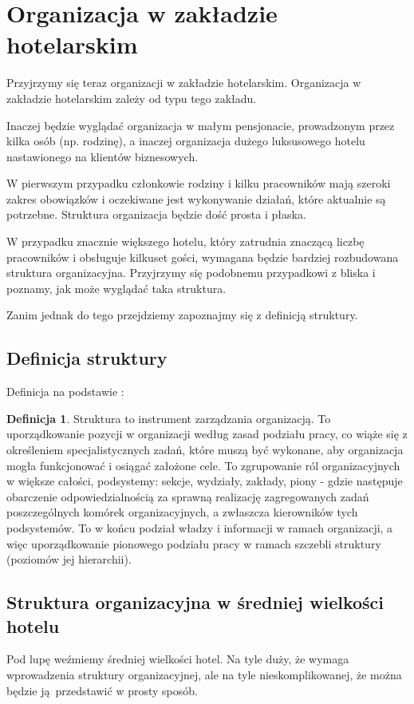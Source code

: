 \documentclass[a4paper,onecolumn,oneside,11pt,wide,floatssmall]{mwrep}
\theoremstyle{definition}
\newtheorem{defn}{Definicja}[section]
\theoremstyle{plain}%
\theoremstyle{remark}
\begin{document}
\section{Organizacja w zakładzie hotelarskim}
Przyjrzymy się teraz organizacji w zakładzie hotelarskim. Organizacja w 
zakładzie hotelarskim zależy od typu tego zakładu.

Inaczej będzie wyglądać organizacja w małym pensjonacie, prowadzonym przez 
kilka osób (np. rodzinę), a inaczej organizacja dużego 
luksusowego hotelu nastawionego na klientów biznesowych. 

W pierwszym przypadku członkowie rodziny i kilku pracowników mają szeroki 
zakres obowiązków i oczekiwane jest wykonywanie działań, które aktualnie są 
potrzebne. Struktura organizacja będzie dość prosta i płaska.

W przypadku znacznie większego hotelu, który zatrudnia znaczącą liczbę 
pracowników i obsługuje kilkuset gości, wymagana będzie bardziej rozbudowana 
struktura organizacyjna. Przyjrzymy się podobnemu przypadkowi z bliska i 
poznamy, jak może wyglądać taka struktura. 

Zanim jednak do tego przejdziemy zapoznajmy się z definicją struktury.

\subsection{Definicja struktury}
Definicja na podstawie \cite{bk:def-struktury}:
\begin{defn}{Struktura} 
to instrument zarządzania organizacją. To uporządkowanie pozycji w 
organizacji według zasad podziału pracy, co wiąże się z określeniem 
specjalistycznych zadań, które muszą być wykonane, aby organizacja mogła 
funkcjonować i osiągać założone cele. To zgrupowanie ról organizacyjnych w 
większe całości, podsystemy: sekcje, wydziały, zakłady, piony - gdzie 
następuje obarczenie odpowiedzialnością za sprawną realizację zagregowanych 
zadań poszczególnych komórek organizacyjnych, a zwłaszcza kierowników tych 
podsystemów. To w końcu podział władzy i informacji w ramach organizacji, a 
więc uporządkowanie pionowego podziału pracy w ramach szczebli struktury 
(poziomów jej hierarchii).
\end{defn}

\subsection{Struktura organizacyjna w średniej wielkości hotelu}
Pod lupę weźmiemy średniej wielkości hotel. Na tyle duży, że wymaga 
wprowadzenia struktury organizacyjnej, ale na tyle nieskomplikowanej, że można 
będzie \mbox{ją przedstawić} w prosty sposób.
\end{document}
